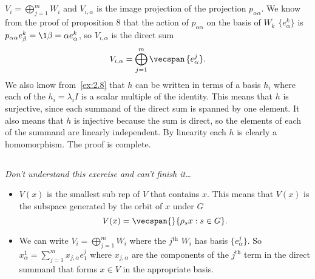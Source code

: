 \documentclass[a4paper, oneside, 10pt]{article}
\numberwithin{Answer}{section}
\numberwithin{Exercise}{section}
\begin{document}
\subsection{}
$V_i = \bigoplus_{j=1}^m W_i$ and $V_{i, \alpha}$ is the image projection of the projection $p_{\alpha \alpha}$.
We know from the proof of proposition 8 that the action of $p_{\alpha \alpha}$ on the basis of $W_k$ $\{e^k_\alpha\}$
is $p_{\alpha \alpha}e^k_\beta = \1{\beta = \alpha} e^k_\alpha$, so $V_{i, \alpha}$ is the direct sum
\[
    V_{i, \alpha} = \bigoplus_{j=1}^m \vecspan \,\{e^j_\alpha\}.
\]
We also know from~\ref{ex:2.8} that $h$ can be written in terms of a basis $h_i$ where
each of the $h_i = \lambda_i I$ is a scalar multiple of the identity.
This means that $h$ is surjective, since each summand of the direct sum is spanned by one element.
It also means that $h$ is injective because the sum is direct, so the elements of 
each of the summand are linearly independent.
By linearity each $h$ is clearly a homomorphism.
The proof is complete.

\subsection{}
\emph{Don't understand this exercise and can't finish it\dots}
\begin{itemize}
    \item $V(x)$ is the smallest sub rep of $V$ that contains $x$. This means that $V(x)$ is the subspace
        generated by the orbit of $x$ under $G$
        \[
            V(x) = \vecspan{} \{\rho_s x: s \in G\}.
        \]
    \item We can write $V_i = \bigoplus_{j=1}^m W_i$ where the $j^{\text{th}}$ $W_i$ has basis $\{e^j_\alpha\}$.
        So $x^1_\alpha = \sum_{j=1}^m x_{j, \alpha} e^j_1$ where $x_{j, \alpha}$ are the components of 
        the $j^{\text{th}}$ term in the direct summand that forms $x \in V$ in the appropriate basis.

\end{itemize}



\nocite{*}


\end{document}
